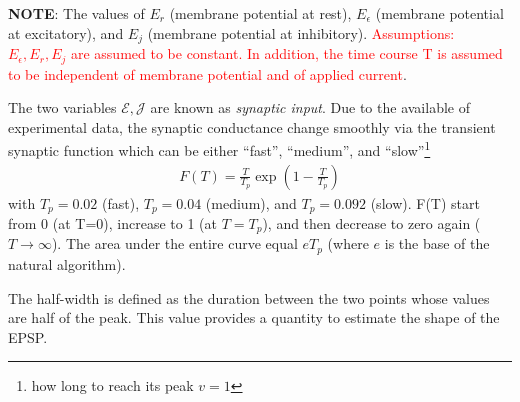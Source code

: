 

{\bf NOTE}: The values of $E_r$ (membrane potential at rest),
$E_\epsilon$ (membrane potential at excitatory), and $E_j$ (membrane
potential at inhibitory).
\textcolor{red}{Assumptions: $E_\epsilon, E_r, E_j$ are assumed to be
  constant. In addition, the time course T is assumed to be independent
  of membrane potential and of applied current}.

The two variables $\mathcal{E}, \mathcal{J}$ are known as
{\it synaptic input}. Due to the available of experimental data, the
synaptic conductance change smoothly via the transient synaptic
function which can be either ``fast'', ``medium'', and
``slow''\footnote{how long to reach its peak $v=1$}
\begin{eqnarray}
  \label{eq:550}
  F(T) = \frac{T}{T_p} \exp(1-\frac{T}{T_p})
\end{eqnarray}
with $T_p=0.02$ (fast), $T_p=0.04$ (medium), and $T_p=0.092$
(slow). F(T) start from 0 (at T=0), increase to 1 (at $T=T_p$), and
then decrease to zero again ($T\rightarrow \infty$). The area under
the entire curve equal $eT_p$ (where $e$ is the base of the natural
algorithm). 

The half-width is defined as the duration between the two points whose
values are half of the peak. This value provides a quantity to
estimate the shape of the EPSP. 

